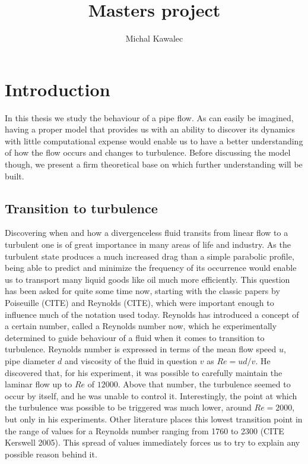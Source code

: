 \documentclass[11pt,a4paper]{article}
\begin{document}
\title{Masters project}
\author{Michal Kawalec}

\section{Introduction}

In this thesis we study the behaviour of a pipe flow.
As can easily be imagined, having a proper model that provides us with an ability to discover its dynamics with little computational expense would enable us to have a better understanding of how the flow occurs and changes to turbulence.
Before discussing the model though, we present a firm theoretical base on which further understanding will be built.

\subsection{Transition to turbulence}
Discovering when and how a divergenceless fluid transits from linear flow to a turbulent one is of great importance in many areas of life and industry.
As the turbulent state produces a much increased drag than a simple parabolic profile, being able to predict and minimize the frequency of its occurrence would enable us to transport many liquid goods like oil much more efficiently.
This question has been asked for quite some time now, starting with the classic papers by Poiseuille (CITE) and Reynolds (CITE), which were important enough to influence much of the notation used today.
Reynolds has introduced a concept of a certain number, called a Reynolds number now, which he experimentally determined to guide behaviour of a fluid when it comes to transition to turbulence.
Reynolds number is expressed in terms of the mean flow speed \(u\), pipe diameter \(d\) and viscosity of the fluid in question \(v\) as \(Re = ud/v\).
He discovered that, for his experiment, it was possible to carefully maintain the laminar flow up to \(Re\) of \(12000\).
Above that number, the turbulence seemed to occur by itself, and he was unable to control it.
Interestingly, the point at which the turbulence was possible to be triggered was much lower, around \(Re = 2000\), but only in his experiments.
Other literature places this lowest transition point in the range of values for a Reynolds number ranging from 1760 to 2300 (CITE Kerswell 2005).
This spread of values immediately forces us to try to explain any possible reason behind it.
\end{document}
